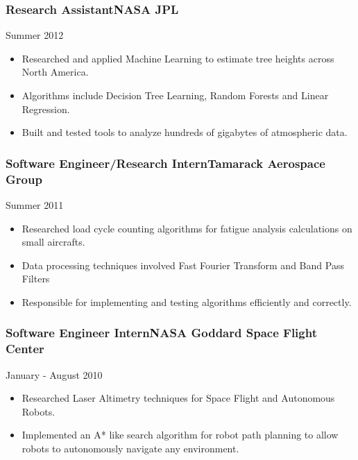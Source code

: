 \documentclass[9pt]{article}
\newenvironment{changemargin}[2]{%
  \begin{list}{}{%
    \setlength{\topsep}{0pt}%
    \setlength{\leftmargin}{#1}%
    \setlength{\rightmargin}{#2}%
    \setlength{\listparindent}{\parindent}%
    \setlength{\itemindent}{\parindent}%
    \setlength{\parsep}{\parskip}%
  }%
  \item[]}{\end{list}
}
\newenvironment{body} {
    \vspace*{-16pt}
    \begin{changemargin}{-0.20in}{-0.5in}
  }
    {\end{changemargin}
}
\newenvironment{jobdescriptionlist}[3]{
  \subsubsection*{#1\hfill\small#2}
  \small
  \vspace*{-5pt}
  {\hfill #3}
  \vspace*{-10pt}
  \begin{itemize}
   \setlength{\topsep}{0pt}
   \setlength{\itemsep}{1pt}
   \setlength{\parskip}{0pt}
   \setlength{\parsep}{0pt}
}{\end{itemize}\vspace*{-3pt}\normalsize}
\begin{document}
\begin{body}
    \begin{jobdescriptionlist}{Research Assistant}{NASA JPL}{Summer 2012}
        \item Researched and applied Machine Learning to estimate tree heights across North America.
        \item Algorithms include Decision Tree Learning, Random Forests and Linear Regression.
        \item Built and tested tools to analyze hundreds of gigabytes of atmospheric data.
    \end{jobdescriptionlist}

    \begin{jobdescriptionlist}{Software Engineer/Research Intern}{Tamarack Aerospace Group}{Summer 2011}
        \item Researched load cycle counting algorithms for fatigue analysis calculations on small aircrafts.
        \item Data processing techniques involved Fast Fourier Transform and Band Pass Filters
        \item Responsible for implementing and testing algorithms efficiently and correctly.
    \end{jobdescriptionlist}


    \begin{jobdescriptionlist}{Software Engineer Intern}{NASA Goddard Space Flight Center}{January - August 2010}
        \item Researched Laser Altimetry techniques for Space Flight and Autonomous Robots.
        \item Implemented an A* like search algorithm for robot path planning to allow robots to autonomously navigate any environment.
    \end{jobdescriptionlist}



\end{body}
\end{document}
